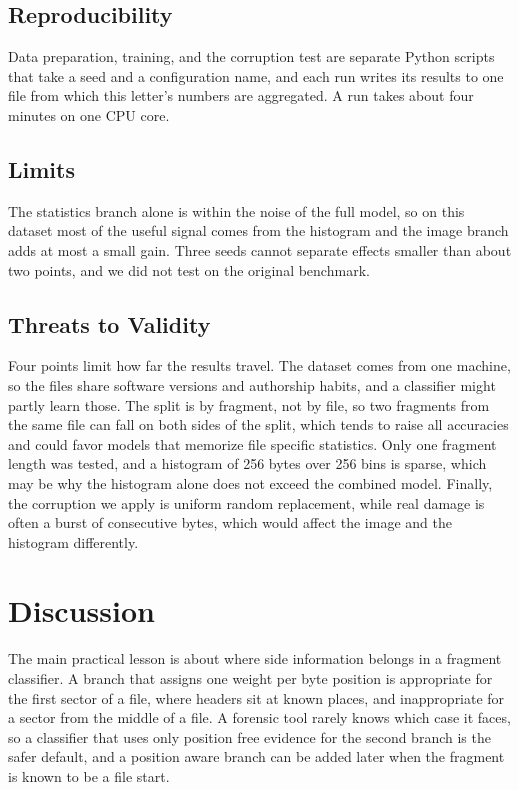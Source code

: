 \documentclass[journal]{IEEEtran}
\begin{document}
\subsection{Reproducibility}
Data preparation, training, and the corruption test are separate Python scripts that take a seed and a configuration name, and each run writes its results to one file from which this letter's numbers are aggregated. A run takes about four minutes on one CPU core.

\subsection{Limits}
The statistics branch alone is within the noise of the full model, so on this dataset most of the useful signal comes from the histogram and the image branch adds at most a small gain. Three seeds cannot separate effects smaller than about two points, and we did not test on the original benchmark.

\subsection{Threats to Validity}
Four points limit how far the results travel. The dataset comes from one machine, so the files share software versions and authorship habits, and a classifier might partly learn those. The split is by fragment, not by file, so two fragments from the same file can fall on both sides of the split, which tends to raise all accuracies and could favor models that memorize file specific statistics. Only one fragment length was tested, and a histogram of 256 bytes over 256 bins is sparse, which may be why the histogram alone does not exceed the combined model. Finally, the corruption we apply is uniform random replacement, while real damage is often a burst of consecutive bytes, which would affect the image and the histogram differently.

\section{Discussion}
The main practical lesson is about where side information belongs in a fragment classifier. A branch that assigns one weight per byte position is appropriate for the first sector of a file, where headers sit at known places, and inappropriate for a sector from the middle of a file. A forensic tool rarely knows which case it faces, so a classifier that uses only position free evidence for the second branch is the safer default, and a position aware branch can be added later when the fragment is known to be a file start.
\end{document}
